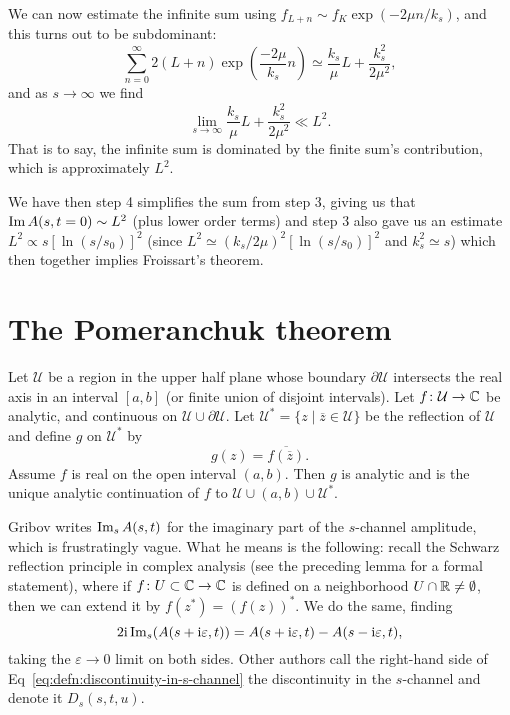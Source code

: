 We can now estimate the infinite sum using $f_{L+n}\sim f_{K}\exp(-2\mu n/k_{s})$,
and this turns out to be subdominant:
\begin{equation}
\sum^{\infty}_{n=0}2(L+n)\exp\left(\frac{-2\mu}{k_{s}}n\right)\simeq\frac{k_{s}}{\mu}L
+\frac{k_{s}^{2}}{2\mu^{2}},
\end{equation}
and as $s\to\infty$ we find
\begin{equation}
\lim_{s\to\infty}\frac{k_{s}}{\mu}L
+\frac{k_{s}^{2}}{2\mu^{2}}\ll L^{2}.
\end{equation}
That is to say, the infinite sum is dominated by the finite sum's
contribution, which is approximately $L^{2}$.

We have then step 4 simplifies the sum from step 3, giving us that
$\operatorname{Im}A(s,t=0)\sim L^{2}$ (plus lower order terms) 
and step 3 also gave us an estimate $L^{2}\propto s[\ln(s/s_{0})]^{2}$
(since $L^{2}\simeq (k_{s}/2\mu)^{2}[\ln(s/s_{0})]^{2}$ and
$k_{s}^{2}\simeq s$)
which then together implies Froissart's theorem.\qquad\qedsymbol


\section{The Pomeranchuk theorem}

\begin{lemma}
Let $\mathcal{U}$ be a region in the upper half plane whose boundary
$\partial\mathcal{U}$ intersects the real axis in an interval $[a,b]$
(or finite union of disjoint intervals). Let $f\colon\mathcal{U}\to\mathbb{C}$
be analytic, and continuous on $\mathcal{U}\cup\partial\mathcal{U}$.
Let $\mathcal{U}^{*}=\{z\mid\overline{z}\in\mathcal{U}\}$ be the
reflection of $\mathcal{U}$ and define $g$ on $\mathcal{U}^{*}$ by
\begin{equation}
g(z) = \overline{f(\overline{z})}.
\end{equation}
Assume $f$ is real on the open interval $(a,b)$. Then $g$ is analytic
and is the unique analytic continuation of $f$ to
$\mathcal{U}\cup(a,b)\cup\mathcal{U}^{*}$. 
\end{lemma}

Gribov writes $\operatorname{Im}_{s}A(s,t)$ for the imaginary part of the
$s$-channel amplitude, which is frustratingly vague. What he means is
the following: recall the Schwarz reflection principle in complex
analysis (see the preceding lemma for a formal statement), where if
$f\colon U\subset\mathbb{C}\to\mathbb{C}$ is defined on a
neighborhood $U\cap\mathbb{R}\neq\emptyset$, then we can extend it by
$f(z^{*})=(f(z))^{*}$.
We do the same, finding
\begin{equation}\label{eq:defn:discontinuity-in-s-channel}
2\mathrm{i}\operatorname{Im}_{s}(A(s+\mathrm{i}\varepsilon,t)) = A(s+\mathrm{i}\varepsilon,t)-A(s-\mathrm{i}\varepsilon,t),
\end{equation}
taking the $\varepsilon\to0$ limit on both sides.
Other authors call the right-hand side of Eq~\eqref{eq:defn:discontinuity-in-s-channel} the discontinuity in the $s$-channel and denote
it $D_{s}(s,t,u)$.

